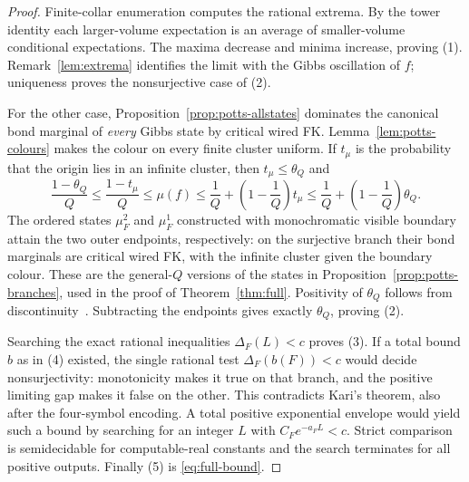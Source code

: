 \begin{proof}
Finite-collar enumeration computes the rational extrema. By the tower identity each larger-volume expectation is an average of smaller-volume conditional expectations. The maxima decrease and minima increase, proving (1). Remark~\ref{lem:extrema} identifies the limit with the Gibbs oscillation of $f$; uniqueness proves the nonsurjective case of (2).

For the other case, Proposition~\ref{prop:potts-allstates} dominates the canonical bond marginal of \emph{every} Gibbs state by critical wired FK. Lemma~\ref{lem:potts-colours} makes the colour on every finite cluster uniform. If $t_\mu$ is the probability that the origin lies in an infinite cluster, then $t_\mu\le\theta_Q$ and
\[
 \frac{1-\theta_Q}{Q}\le\frac{1-t_\mu}{Q}
 \le\mu(f)\le\frac1Q+\left(1-\frac1Q\right)t_\mu
 \le\frac1Q+\left(1-\frac1Q\right)\theta_Q.
\]
The ordered states $\mu_F^2$ and $\mu_F^1$ constructed with monochromatic visible boundary attain the two outer endpoints, respectively: on the surjective branch their bond marginals are critical wired FK, with the infinite cluster given the boundary colour. These are the general-$Q$ versions of the states in Proposition~\ref{prop:potts-branches}, used in the proof of Theorem~\ref{thm:full}. Positivity of $\theta_Q$ follows from discontinuity~\cite[Theorems 1.1(2) and 1.2(2)]{DGHMT}. Subtracting the endpoints gives exactly $\theta_Q$, proving (2).

Searching the exact rational inequalities $\Delta_F(L)<c$ proves (3). If a total bound $b$ as in (4) existed, the single rational test $\Delta_F(b(F))<c$ would decide nonsurjectivity: monotonicity makes it true on that branch, and the positive limiting gap makes it false on the other. This contradicts Kari's theorem, also after the four-symbol encoding. A total positive exponential envelope would yield such a bound by searching for an integer $L$ with $C_Fe^{-a_FL}<c$. Strict comparison is semidecidable for computable-real constants and the search terminates for all positive outputs. Finally (5) is \eqref{eq:full-bound}.
\end{proof}

